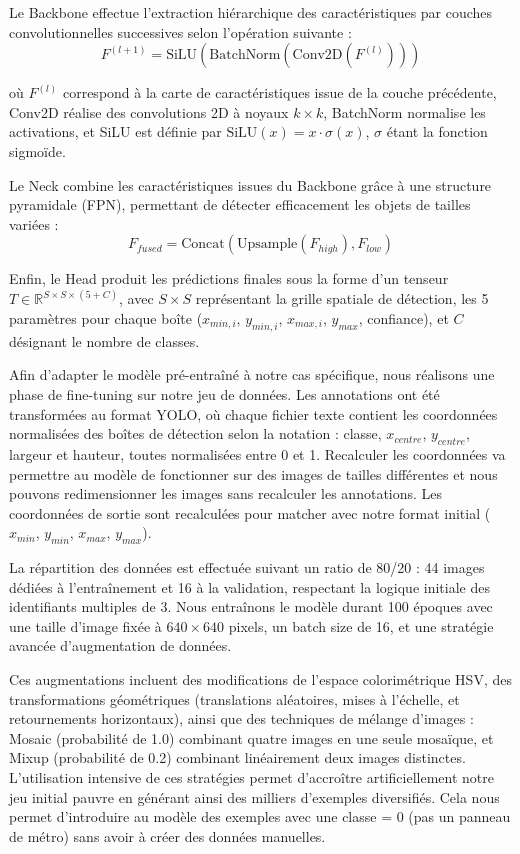 \documentclass[journal]{IEEEtran}
\begin{document}
Le Backbone effectue l'extraction hiérarchique des caractéristiques par couches convolutionnelles successives selon l'opération suivante :
$$\scriptstyle F^{(l+1)} = \text{SiLU}\left(\text{BatchNorm}\left(\text{Conv2D}(F^{(l)})\right)\right)$$

où $F^{(l)}$ correspond à la carte de caractéristiques issue de la couche précédente, Conv2D réalise des convolutions 2D à noyaux $k \times k$, BatchNorm normalise les activations, et SiLU est définie par $\text{SiLU}(x) = x \cdot \sigma(x)$, $\sigma$ étant la fonction sigmoïde.

Le Neck combine les caractéristiques issues du Backbone grâce à une structure pyramidale (FPN), permettant de détecter efficacement les objets de tailles variées :
$$\scriptstyle F_{fused} = \text{Concat}\left(\text{Upsample}(F_{high}), F_{low}\right)$$

Enfin, le Head produit les prédictions finales sous la forme d'un tenseur $T \in \mathbb{R}^{S\times S\times(5+C)}$, avec $S\times S$ représentant la grille spatiale de détection, les 5 paramètres pour chaque boîte ($x_{min,i}$, $y_{min,i}$, $x_{max,i}$, $y_{max}$, confiance), et $C$ désignant le nombre de classes.

Afin d'adapter le modèle pré-entraîné à notre cas spécifique, nous réalisons une phase de fine-tuning sur notre jeu de données. Les annotations ont été transformées au format YOLO, où chaque fichier texte contient les coordonnées normalisées des boîtes de détection selon la notation : classe, $x_{centre}$, $y_{centre}$, largeur et hauteur, toutes normalisées entre 0 et 1. Recalculer les coordonnées va permettre au modèle de fonctionner sur des images de tailles différentes et nous pouvons redimensionner les images sans recalculer les annotations. Les coordonnées de sortie sont recalculées pour matcher avec notre format initial ($x_{min}$, $y_{min}$, $x_{max}$, $y_{max}$).

La répartition des données est effectuée suivant un ratio de 80/20 : 44 images dédiées à l'entraînement et 16 à la validation, respectant la logique initiale des identifiants multiples de 3. Nous entraînons le modèle durant 100 époques avec une taille d'image fixée à $640\times640$ pixels, un batch size de 16, et une stratégie avancée d'augmentation de données.

Ces augmentations incluent des modifications de l'espace colorimétrique HSV, des transformations géométriques (translations aléatoires, mises à l'échelle, et retournements horizontaux), ainsi que des techniques de mélange d'images : Mosaic (probabilité de 1.0) combinant quatre images en une seule mosaïque, et Mixup (probabilité de 0.2) combinant linéairement deux images distinctes. L'utilisation intensive de ces stratégies permet d'accroître artificiellement notre jeu initial pauvre en générant ainsi des milliers d'exemples diversifiés. Cela nous permet d'introduire au modèle des exemples avec une classe = 0 (pas un panneau de métro) sans avoir à créer des données manuelles.
\end{document}
